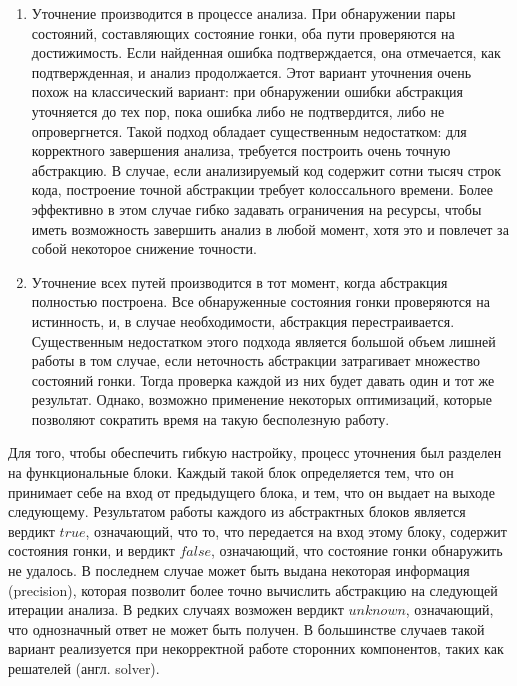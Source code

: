 \begin{enumerate}
\item Уточнение производится в процессе анализа. При обнаружении пары состояний, составляющих состояние гонки, оба пути проверяются на достижимость.
Если найденная ошибка подтверждается, она отмечается, как подтвержденная, и анализ продолжается.
Этот вариант уточнения очень похож на классический вариант: при обнаружении ошибки абстракция уточняется до тех пор, пока ошибка либо не подтвердится, либо не опровергнется.
Такой подход обладает существенным недостатком: для корректного завершения анализа, требуется построить очень точную абстракцию. 
В случае, если анализируемый код содержит сотни тысяч строк кода, построение точной абстракции требует колоссального времени. 
Более эффективно в этом случае гибко задавать ограничения на ресурсы, чтобы иметь возможность завершить анализ в любой момент, хотя это и повлечет за собой некоторое снижение точности. 

\item Уточнение всех путей производится в тот момент, когда абстракция полностью построена.
Все обнаруженные состояния гонки проверяются на истинность, и, в случае необходимости, абстракция перестраивается. 
Существенным недостатком этого подхода является большой объем лишней работы в том случае, если неточность абстракции затрагивает множество состояний гонки.
Тогда проверка каждой из них будет давать один и тот же результат.
Однако, возможно применение некоторых оптимизаций, которые позволяют сократить время на такую бесполезную работу. 

\end{enumerate}


Для того, чтобы обеспечить гибкую настройку, процесс уточнения был разделен на функциональные блоки.
Каждый такой блок определяется тем, что он принимает себе на вход от предыдущего блока, и тем, что он выдает на выходе следующему.
Результатом работы каждого из абстрактных блоков является вердикт $true$, означающий, что то, что передается на вход этому блоку, содержит состояния гонки, и вердикт $false$, означающий, что состояние гонки обнаружить не удалось.
В последнем случае может быть выдана некоторая информация (precision), которая позволит более точно вычислить абстракцию на следующей итерации анализа.
В редких случаях возможен вердикт $unknown$, означающий, что однозначный ответ не может быть получен. 
В большинстве случаев такой вариант реализуется при некорректной работе сторонних компонентов, таких как решателей (англ. solver).

